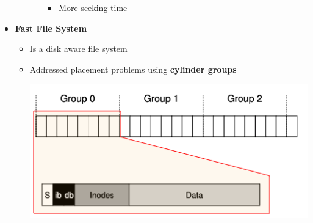 \documentclass[12pt]{article}
\begin{document}
\begin{itemize}
\begin{itemize}
\begin{enumerate}[1.]
            \begin{itemize}
                \item More seeking time
            \end{itemize}
        \end{enumerate}
    \end{itemize}

    \item \textbf{Fast File System}

    \begin{itemize}
        \item Is a disk aware file system
        \item Addressed placement problems using \textbf{cylinder groups}

        \begin{center}
        \includegraphics[width=0.8\linewidth]{images/notes_8.png}
        \end{center}


\end{itemize}
\end{itemize}
\end{document}
